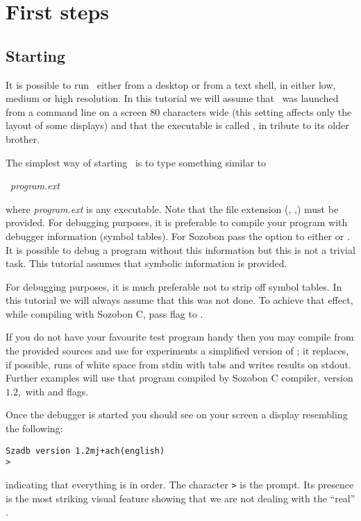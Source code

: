\section{First steps}

\subsection{Starting}
It is possible to run \szadb\ either from a desktop or from a text shell, in
either low, medium or high resolution. In this tutorial we will assume that
\szadb\ was launched from a command line on a screen 80 characters wide (this
setting affects only the layout of some displays) and that the executable is
called \adb, in tribute to its older brother.

The simplest way of starting \szadb\ is to type something similar to
\begin{exmpl}
	\adb\ {\it program.ext}
\end{exmpl}
where {\it program.ext} is any executable.
Note that the file extension (, ,)
must be provided.
For debugging purposes, it is preferable to compile your
program with debugger information (symbol tables). For Sozobon pass the option
 to either  or .
It is possible to debug a program without this
information but this is not a trivial task. This tutorial assumes that symbolic
information is provided.

For debugging purposes, it is much preferable not to strip off symbol
tables.  In this tutorial we will always assume that this was not
done.
To achieve that effect, while compiling 
with Sozobon C, pass  flag to .

If you do not have your favourite test program handy then
you may compile from the provided sources
and use for experiments a simplified version of ;
it replaces, if possible, runs of white space 
from stdin with tabs and writes results on stdout.
Further examples will use that program compiled by Sozobon C compiler,
version $1.2,$ with  and  flags.

Once the debugger is started you should see on your screen a display
resembling the following:
\begin{exmpl}
	{\tt Szadb version 1.2mj+ach(english)}\\
	{\tt >} 
\end{exmpl}
indicating that everything is in order.
The character {\tt >} is the prompt.  Its presence is the most striking
visual feature showing that we are not dealing with the ``real''
.

